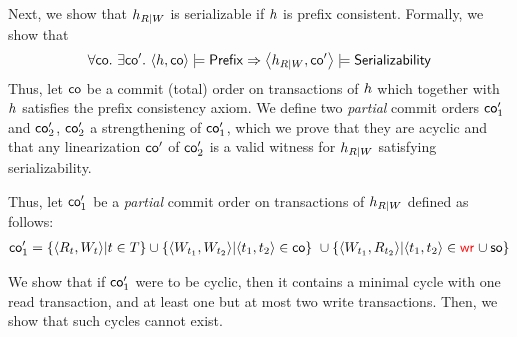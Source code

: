 Next, we show that ${h}_{R|W}$ is serializable if ${h}$ is prefix consistent. Formally, we show that
 \begin{align*}
  \forall \mathsf{co}.\ \exists \mathsf{co}'.\ {\left\langle{{h}, \mathsf{co}}\right\rangle} \models \mathsf{Prefix} \Rightarrow {\left\langle{{h}_{R|W}, \mathsf{co}'}\right\rangle} \models \mathsf{Serializability} 
 \end{align*}
%
%
%
% 
%
Thus, let $\mathsf{co}$ be a commit (total) order on transactions of ${h}$ which together with ${h}$ satisfies the prefix consistency axiom. We define two \emph{partial} commit orders $\mathsf{co}'_1$ and $\mathsf{co}'_2$, $\mathsf{co}'_2$ a strengthening of $\mathsf{co}'_1$, which we prove that they are acyclic and that any linearization $\mathsf{co}'$ of $\mathsf{co}'_2$ is a valid witness for ${h}_{R|W}$ satisfying serializability.

Thus, let $\mathsf{co}'_1$ be a \emph{partial} commit order on transactions of ${h}_{R|W}$ defined as follows:
 \begin{align*}
  \mathsf{co}'_1 = \{{\left\langle{R_{{t}}, W_{{t}}}\right\rangle} | {t} \in T\} \cup \{{\left\langle{W_{{t}_1}, W_{{t}_2}}\right\rangle} | {\left\langle{{t}_1, {t}_2}\right\rangle} \in \mathsf{co}\}\ \cup \{{\left\langle{W_{{t}_1},R_{{t}_2}}\right\rangle} | {\left\langle{{t}_1, {t}_2}\right\rangle} \in \textcolor{red}{\mathsf{wr}_{}} \cup \mathsf{so}\} 
 \end{align*}
 
We show that if $\mathsf{co}'_1$ were to be cyclic, then it contains a minimal cycle with one read transaction, and at least one but at most two write transactions. Then, we show that such cycles cannot exist. 

